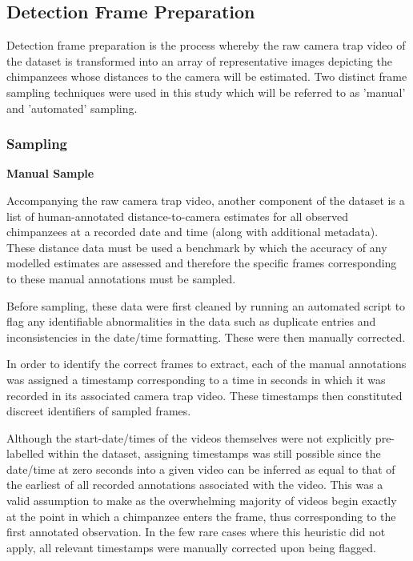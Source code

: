 \subsection{Detection Frame Preparation}

Detection frame preparation is the process whereby the raw camera trap video of the dataset
is transformed into an array of representative images depicting the chimpanzees whose
distances to the camera will be estimated.
Two distinct frame sampling techniques were used in this study which will be referred to as
'manual' and 'automated' sampling.

\vspace{-3mm}

\subsubsection{Sampling}\label{subsubsec:sampling}

\vspace{5mm}
\textbf{Manual Sample}

Accompanying the raw camera trap video, another component of the dataset is a list of
human-annotated distance-to-camera estimates for all observed chimpanzees at a recorded
date and time (along with additional metadata).
These distance data must be used a benchmark by which the accuracy of any modelled estimates
are assessed and therefore the specific frames corresponding to these manual annotations must
be sampled.

Before sampling, these data were first cleaned by running an automated script to flag any
identifiable abnormalities in the data such as duplicate entries and inconsistencies in the
date/time formatting.
These were then manually corrected.

In order to identify the correct frames to extract, each of the manual annotations was assigned
a timestamp corresponding to a time in seconds in which it was recorded in its associated camera
trap video.
These timestamps then constituted discreet identifiers of sampled frames.

Although the start-date/times of the videos themselves were not explicitly pre-labelled within
the dataset, assigning timestamps was still possible since the date/time at zero seconds into
a given video can be inferred as equal to that of the earliest of all recorded annotations
associated with the video.
This was a valid assumption to make as the overwhelming majority of videos begin exactly at the
point in which a chimpanzee enters the frame, thus corresponding to the first annotated observation.
In the few rare cases where this heuristic did not apply, all relevant timestamps were manually
corrected upon being flagged.

